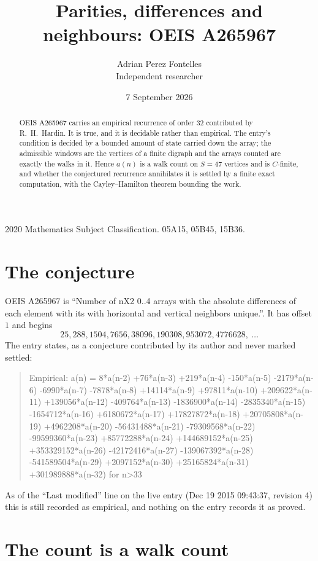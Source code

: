 \documentclass[11pt,a4paper]{article}
\title{Parities, differences and neighbours: OEIS A265967}
\author{Adrian Perez Fontelles\\ \small Independent researcher}
\date{7 September 2026}
\theoremstyle{plain}
\theoremstyle{definition}
\begin{document}
\maketitle

\begin{abstract}
OEIS A265967 carries an empirical recurrence of order $32$ contributed by R.~H.~Hardin. It is
true, and it is decidable rather than empirical. The entry's condition is decided by a bounded amount of state carried down the array; the
admissible windows are the vertices of a finite digraph and the arrays counted are exactly the
walks in it. Hence $a(n)$ is a walk count on $S=47$ vertices and is $C$-finite, and whether the
conjectured recurrence annihilates it is settled by a finite exact computation, with the
Cayley--Hamilton theorem bounding the work.
\end{abstract}

\noindent\small 2020 Mathematics Subject Classification. 05A15, 05B45, 15B36.\normalsize

\section{The conjecture}

OEIS A265967 is ``Number of nX2 0..4 arrays with the absolute differences of each element with its with horizontal and vertical neighbors unique.''. It has offset $1$ and begins
\[
25, 288, 1504, 7656, 38096, 190308, 953072, 4776628,\ \dots
\]
The entry states, as a conjecture contributed by its author and never marked settled:
\begin{quote}
Empirical: a(n) = 8*a(n-2) +76*a(n-3) +219*a(n-4) -150*a(n-5) -2179*a(n-6) -6990*a(n-7) -7878*a(n-8) +14114*a(n-9) +97811*a(n-10) +209622*a(n-11) +139056*a(n-12) -409764*a(n-13) -1836900*a(n-14) -2835340*a(n-15) -1654712*a(n-16) +6180672*a(n-17) +17827872*a(n-18) +20705808*a(n-19) +4962208*a(n-20) -56431488*a(n-21) -79309568*a(n-22) -99599360*a(n-23) +85772288*a(n-24) +144689152*a(n-25) +353329152*a(n-26) -42172416*a(n-27) -139067392*a(n-28) -541589504*a(n-29) +2097152*a(n-30) +25165824*a(n-31) +301989888*a(n-32) for n>33
\end{quote}
As of the ``Last modified'' line on the live entry (Dec 19 2015 09:43:37, revision 4) this is still
recorded as empirical, and nothing on the entry records it as proved.

\section{The count is a walk count}
\end{document}
